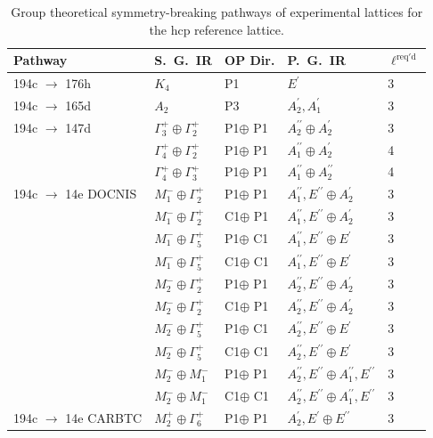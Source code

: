 \documentclass[preprint]{iucr}              %
\begin{document}
\begin{table}
\caption{Group theoretical symmetry-breaking pathways of
experimental lattices for the hcp reference
lattice.}\label{pathwaysHCP}%
\begin{tabular}{lllll}\hline
Pathway & S.~G.~IR & OP Dir. & P.~G.~IR & $\ell^{\mathrm{req'd}}$ \\
\hline
194c $\rightarrow$ 176h & $K_4$ & P1 & $E^\prime$ & 3 \\
194c $\rightarrow$ 165d & $A_2$ & P3 & $A_2^\prime,A_1^\prime$ & 3 \\
194c $\rightarrow$ 147d & $\Gamma_3^+ \oplus \Gamma_2^+$ & P1$ \oplus$ P1 & $A_2^{\prime\prime}\oplus A_2^\prime$ & 3 \\
& $\Gamma_4^+ \oplus \Gamma_2^+$ & P1$ \oplus$ P1 & $A_1^{\prime\prime}\oplus A_2^\prime$ & 4 \\
& $\Gamma_4^+ \oplus \Gamma_3^+$ & P1$ \oplus$ P1 & $A_1^{\prime\prime}\oplus A_2^{\prime\prime}$ & 4 \\
194c  $\rightarrow$ 14e DOCNIS & $M_1^-\oplus \Gamma_2^+$ & P1$ \oplus$ P1 & $A_1^{\prime\prime},E^{\prime\prime} \oplus A_2^\prime $ & 3 \\
& $M_1^- \oplus \Gamma_2^+$ & C1$ \oplus$ P1 & $A_1^{\prime\prime},E^{\prime\prime} \oplus A_2^\prime$ & 3 \\
& $M_1^- \oplus \Gamma_5^+$ & P1$ \oplus$ C1 & $A_1^{\prime\prime},E^{\prime\prime} \oplus E^{\prime}$ & 3 \\
& $M_1^- \oplus \Gamma_5^+$ & C1$ \oplus$ C1 & $A_1^{\prime\prime},E^{\prime\prime} \oplus E^\prime$ & 3 \\
& $M_2^- \oplus \Gamma_2^+$ & P1$ \oplus$ P1 & $A_2^{\prime\prime},E^{\prime\prime} \oplus A_2^\prime$ & 3 \\
& $M_2^- \oplus \Gamma_2^+$ & C1$ \oplus$ P1 & $A_2^{\prime\prime},E^{\prime\prime} \oplus A_2^\prime$ & 3 \\
& $M_2^- \oplus \Gamma_5^+$ & P1$ \oplus$ C1 & $A_2^{\prime\prime},E^{\prime\prime} \oplus E^\prime$ & 3 \\
& $M_2^- \oplus \Gamma_5^+$ & C1$ \oplus$ C1 & $A_2^{\prime\prime},E^{\prime\prime} \oplus E^\prime$ & 3 \\
& $M_2^- \oplus M_1^- $ & P1$ \oplus$ P1 & $A_2^{\prime\prime},E^{\prime\prime} \oplus A_1^{\prime\prime},E^{\prime\prime}$ & 3 \\
& $M_2^- \oplus M_1^-$ & C1$ \oplus$ C1 & $A_2^{\prime\prime},E^{\prime\prime} \oplus A_1^{\prime\prime},E^{\prime\prime}$ & 3 \\
194c  $\rightarrow$ 14e CARBTC & $M_2^+ \oplus \Gamma_6^+$ & P1$ \oplus$ P1 &  $A_2^\prime,E^\prime \oplus E^{\prime\prime}$ & 3 \\

\end{tabular}
\end{table}
\end{document}

